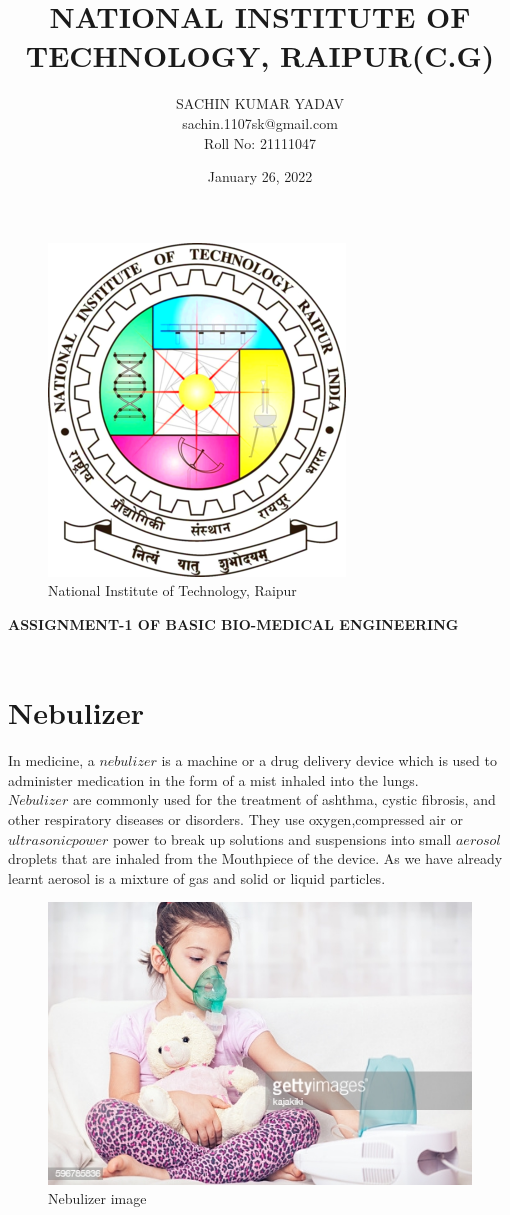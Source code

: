 \documentclass[12pt]{article}
\title{\textbf{NATIONAL INSTITUTE OF TECHNOLOGY, RAIPUR(C.G)}}
\author{SACHIN KUMAR YADAV\\sachin.1107sk@gmail.com\\Roll No: 21111047}
\date{January 26, 2022}
\begin{document}
\maketitle

\begin{figure}[h]
\centering
\includegraphics[scale=0.8]{nit.jpg}
\caption{National Institute of Technology, Raipur}
\end{figure}

\textbf{ASSIGNMENT-1 OF BASIC BIO-MEDICAL ENGINEERING}\\\\


\section{Nebulizer}

In medicine, a $nebulizer$ is a machine or a drug delivery device which is used to administer medication in the form of a mist inhaled into the lungs.\\
$Nebulizer$ are commonly used for the treatment of ashthma, cystic fibrosis, and other respiratory diseases or disorders. They use oxygen,compressed air or $ultrasonic power$ power to break up solutions and suspensions into small $aerosol$ droplets that are inhaled from the Mouthpiece of the device. As we have already learnt aerosol  is a mixture of gas and solid or liquid particles.\\
\begin{figure}[h]
\centering
\includegraphics[scale=0.6]{nebu.jpg}
\caption{Nebulizer image}
\end{figure}
\end{document}
